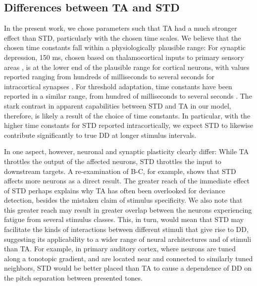 \documentclass[9pt,lineno,onehalfspacing]{elife}
\begin{document}
\subsection{Differences between TA and STD}

In the present work, we chose parameters such that TA had a much stronger effect than STD, particularly with the chosen time scales. We believe that the chosen time constants fall within a physiologically plausible range: For synaptic depression, 150 ms, chosen based on thalamocortical inputs to primary sensory areas \citep{David2013-cw,Pennington2020-ua}, is at the lower end of the plausible range for cortical neurons, with values reported ranging from hundreds of milliseconds to several seconds for intracortical synapses \citep{Tsodyks1997-qt,Markram1998-et,Varela1997-nr, Asari2009-vu,Levy2011-af}. For threshold adaptation, time constants have been reported in a similar range, from hundred of milliseconds \citep{Henze2001-xd, La_Camera2006-dz, Abolafia2011-ig, Pozzorini2015-ei} to several seconds \citep{Schwindt1989-lv, Fleidervish1996-ly, Sanchez-Vives2000-rv, La_Camera2006-dz}. The stark contrast in apparent capabilities between STD and TA in our model, therefore, is likely a result of the choice of time constants. In particular, with the higher time constants for STD reported intracortically, we expect STD to likewise contribute significantly to true DD at longer stimulus intervals.

In one aspect, however, neuronal and synaptic plasticity clearly differ: While TA throttles the output of the affected neurons, STD throttles the input to downstream targets. A re-examination of B-C, for example, shows that STD affects more neurons as a direct result. The greater reach of the immediate effect of STD perhaps explains why TA has often been overlooked for deviance detection, besides the mistaken claim of stimulus specificity. We also note that this greater reach may result in greater overlap between the neurons experiencing fatigue from several stimulus classes. This, in turn, would mean that STD may facilitate the kinds of interactions between different stimuli that give rise to DD, suggesting its applicability to a wider range of neural architectures and of stimuli than TA. For example, in primary auditory cortex, where neurons are tuned along a tonotopic gradient, and are located near and connected to similarly tuned neighbors, STD would be better placed than TA to cause a dependence of DD on the pitch separation between presented tones.
\end{document}
